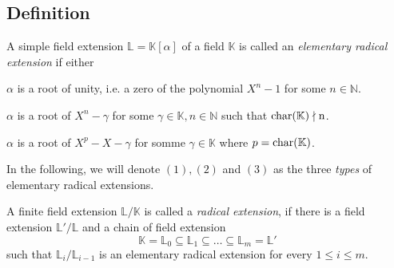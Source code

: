 \documentclass[12pt]{book}
\begin{document}
\begin{spacing}{1.3}
\subsection{Definition} %
\begin{compactenum}
\item A simple field extension $\mathbb{L}=\mathbb{K}[\alpha]$ of a field $\mathbb{K}$ is called an \textit{elementary radical extension} if either
\begin{compactenum}
\item $\alpha$ is a root of unity, i.e. a zero of the polynomial $X^n-1$ for some $n \in \mathbb{N}$.
\item $\alpha$ is a root of $X^n- \gamma$ for some $\gamma \in \mathbb{K}, n \in \mathbb{N}$ such that $\rm{char}(\mathbb{K}) \nmid n$.
\item $\alpha$ is a root of $X^p-X-\gamma$ for somme $\gamma \in \mathbb{K}$ where $p=\rm{char}(\mathbb{K})$.
\end{compactenum}
In the following, we will denote $(1), (2)$ and $(3)$ as the three \textit{types} of elementary radical extensions.
\item  A finite field extension $\mathbb{L}/\mathbb{K}$ is called a \textit{radical extension}, if there is a field extension $\mathbb{L}'/\mathbb{L}$ and a chain of field extension 
$$ \mathbb{K}=\mathbb{L}_0 \subseteq \mathbb{L}_1 \subseteq \dots \subseteq \mathbb{L}_m = \mathbb{L}'$$
such that $\mathbb{L}_i/\mathbb{L}_{i-1}$ is an elementary radical extension for every $1 \leqslant i \leqslant m$.
\end{compactenum}


\end{spacing}
\end{document}
